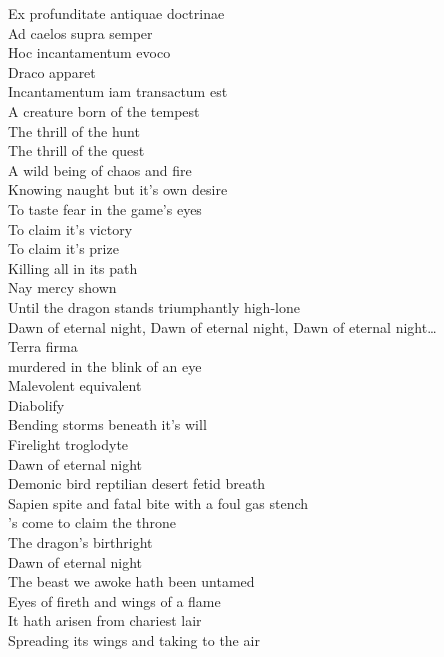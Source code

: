 Ex profunditate antiquae doctrinae\\
Ad caelos supra semper\\
Hoc incantamentum evoco\\
Draco apparet\\
Incantamentum iam transactum est\\

A creature born of the tempest\\
The thrill of the hunt\\
The thrill of the quest\\
A wild being of chaos and fire\\
Knowing naught but it's own desire\\
To taste fear in the game's eyes\\
To claim it's victory\\
To claim it's prize\\
Killing all in its path\\
Nay mercy shown\\
Until the dragon stands triumphantly high-lone\\

Dawn of eternal night, Dawn of eternal night, Dawn of eternal night…\\

Terra firma\\
 murdered in the blink of an eye\\
Malevolent equivalent\\
Diabolify\\
Bending storms beneath it's will\\
Firelight troglodyte\\
Dawn of eternal night\\

Demonic bird reptilian desert fetid breath\\
Sapien spite and fatal bite with a foul gas stench\\
's come to claim the throne\\
The dragon's birthright\\
Dawn of eternal night\\

The beast we awoke hath been untamed\\
Eyes of fireth and wings of a flame\\
It hath arisen from chariest lair\\
Spreading its wings and taking to the air\\


